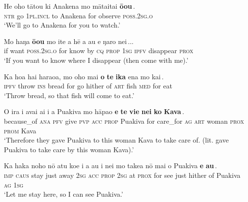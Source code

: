 \ea\label{ex:11.148}
\gll He oho tātou ki {\ꞌ}Anakena {\ob}mo māta{\ꞌ}ita{\ꞌ}i \textbf{ō{\ꞌ}ou}\,{\cb}. \\
\textsc{ntr} go \textsc{1pl.incl} to Anakena {\db}for observe \textsc{poss.2sg.o} \\

\glt 
‘We’ll go to Anakena for you to watch.’ \textstyleExampleref{[R301.259]} 
\z

\ea\label{ex:11.149}
\gll {\ob}Mo haŋa \textbf{ō{\ꞌ}ou} mo {\ꞌ}ite a hē a au e ŋaro nei\,{\cb}...\\
{\db}if want \textsc{poss.2sg.o} for know by \textsc{cq} \textsc{prop} \textsc{1sg} \textsc{ipfv} disappear \textsc{prox}\\

\glt 
‘If you want to know where I disappear (then come with me).’ \textstyleExampleref{[R212.010]} 
\z

\ea\label{ex:11.150}
\gll Ka hoa hai haraoa, {\ob}mo oho mai \textbf{o} \textbf{te} \textbf{ika} ena mo kai\,{\cb}. \\
\textsc{ipfv} throw \textsc{ins} bread {\db}for go hither of \textsc{art} fish \textsc{med} for eat \\

\glt 
‘Throw bread, so that fish will come to eat.’ \textstyleExampleref{[R301.215]} 
\z

\ea\label{ex:11.151}
\gll {\ꞌ}O ira i {\ꞌ}avai ai i a Puakiva {\ob}mo hāpa{\ꞌ}o \textbf{e} \textbf{te} \textbf{vi{\ꞌ}e} \textbf{nei} \textbf{ko} \textbf{Kava}\,{\cb}.\\
because\_of \textsc{ana} \textsc{pfv} give \textsc{pvp} \textsc{acc} \textsc{prop} Puakiva {\db}for care\_for \textsc{ag} \textsc{art} woman \textsc{prox}  \textsc{prom} Kava\\

\glt 
‘Therefore they gave Puakiva to this woman Kava to take care of. (lit. gave Puakiva to take care by this woman Kava).’ \textstyleExampleref{[R229.006]} 
\z

\ea\label{ex:11.152}
\gll Ka haka noho nō atu koe i a au {\ꞌ}i nei {\ob}mo take{\ꞌ}a nō mai  o Puakiva \textbf{e} \textbf{au}\,{\cb}.\\
\textsc{imp} \textsc{caus} stay just away \textsc{2sg} \textsc{acc} \textsc{prop} \textsc{2sg} at \textsc{prox} {\db}for see just hither  of Puakiva \textsc{ag} \textsc{1sg}\\

\glt 
‘Let me stay here, so I can see Puakiva.’ \textstyleExampleref{[R229.013]} 
\z

